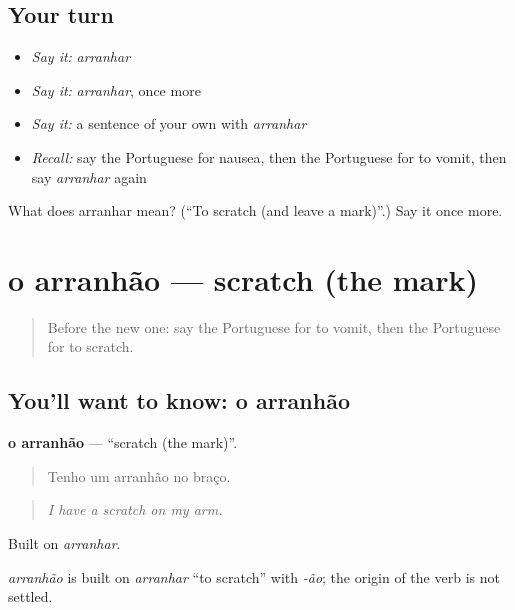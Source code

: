 \subsection*{Your turn}
\begin{itemize}
\raggedright
  \item \emph{Say it:} \emph{arranhar}
  \item \emph{Say it:} \emph{arranhar}, once more
  \item \emph{Say it:} a sentence of your own with \emph{arranhar}
  \item \emph{Recall:} say the Portuguese for nausea, then the Portuguese for to vomit, then say \emph{arranhar} again
\end{itemize}

\begin{tcolorbox}[breakable,colback=teal!4,colframe=teal!35!black,title={Before you move on}]
What does arranhar mean? (\textquotedblleft{}To scratch (and leave a mark)\textquotedblright{}.) Say it once more.
\end{tcolorbox}
\section[o arranhão]{o arranhão — scratch (the mark)}

\label{lesson:PT-C485-arranhao}



\begin{quote}
Before the new one: say the Portuguese for to vomit, then the Portuguese for to scratch.
\end{quote}

\subsection*{You'll want to know: o arranhão}
\textbf{o arranhão} — \textquotedblleft{}scratch (the mark)\textquotedblright{}.

\begin{quote}
Tenho um arranhão no braço.
\end{quote}

\begin{quote}
\emph{I have a scratch on my arm.}
\end{quote}

Built on \emph{arranhar}.

\begin{cousinweb}
\emph{arranhão} is built on \emph{arranhar} \textquotedblleft{}to scratch\textquotedblright{} with \emph{-ão}; the origin of the verb is not settled.
\end{cousinweb}

